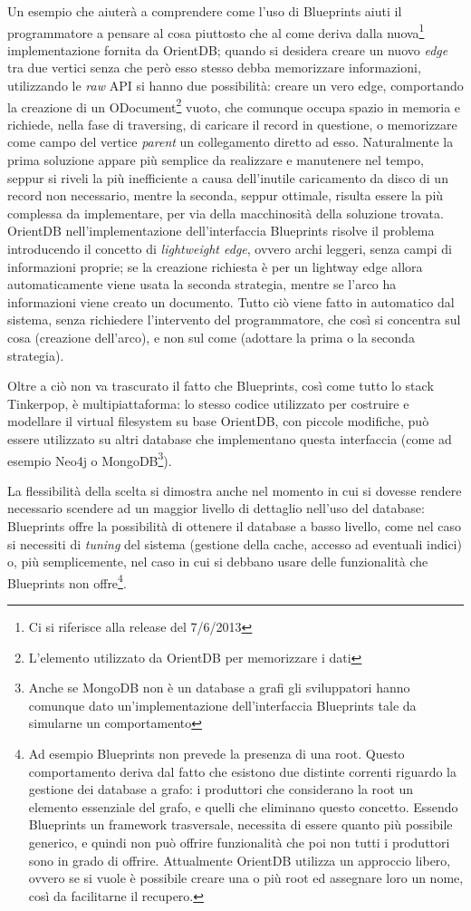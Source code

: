 Un esempio che aiuterà a comprendere come l'uso di Blueprints aiuti il programmatore a pensare al cosa piuttosto che al come deriva dalla nuova\footnote{Ci si riferisce alla release del 7/6/2013} implementazione fornita da OrientDB; quando si desidera creare un nuovo \emph{edge} tra due vertici senza che però esso stesso debba memorizzare informazioni, utilizzando le \emph{raw} API si hanno due possibilità: creare un vero edge, comportando la creazione di un ODocument\footnote{L'elemento utilizzato da OrientDB per memorizzare i dati} vuoto, che comunque occupa spazio in memoria e richiede, nella fase di traversing, di caricare il record in questione, o memorizzare come campo del vertice \emph{parent} un collegamento diretto ad esso. Naturalmente la prima soluzione appare più semplice da realizzare e manutenere nel tempo, seppur si riveli la più inefficiente a causa dell'inutile caricamento da disco di un record non necessario, mentre la seconda, seppur ottimale, risulta essere la più complessa da implementare, per via della macchinosità della soluzione trovata. OrientDB nell'implementazione dell'interfaccia Blueprints risolve il problema introducendo il concetto di \emph{lightweight edge}, ovvero archi leggeri, senza campi di informazioni proprie; se la creazione richiesta è per un lightway edge allora automaticamente viene usata la seconda strategia, mentre se l'arco ha informazioni viene creato un documento. Tutto ciò viene fatto in automatico dal sistema, senza richiedere l'intervento del programmatore, che così si concentra sul cosa (creazione dell'arco), e non sul come (adottare la prima o la seconda strategia).

Oltre a ciò non va trascurato il fatto che Blueprints, così come tutto lo stack Tinkerpop, è multipiattaforma: lo stesso codice utilizzato per costruire e modellare il virtual filesystem su base OrientDB, con piccole modifiche, può essere utilizzato su altri database che implementano questa interfaccia (come ad esempio Neo4j o MongoDB\footnote{Anche se MongoDB non è un database a grafi gli sviluppatori hanno comunque dato un'implementazione dell'interfaccia Blueprints tale da simularne un comportamento}).

La flessibilità della scelta si dimostra anche nel momento in cui si dovesse rendere necessario scendere ad un maggior livello di dettaglio nell'uso del database: Blueprints offre la possibilità di ottenere il database a basso livello, come nel caso si necessiti di \emph{tuning} del sistema (gestione della cache, accesso ad eventuali indici) o, più semplicemente, nel caso in cui si debbano usare delle funzionalità che Blueprints non offre\footnote{Ad esempio Blueprints non prevede la presenza di una root. Questo comportamento deriva dal fatto che esistono due distinte correnti riguardo la gestione dei database a grafo: i produttori che considerano la root un elemento essenziale del grafo, e quelli che eliminano questo concetto. Essendo Blueprints un framework trasversale, necessita di essere quanto più possibile generico, e quindi non può offrire funzionalità che poi non tutti i produttori sono in grado di offrire. Attualmente OrientDB utilizza un approccio libero, ovvero se si vuole è possibile creare una o più root ed assegnare loro un nome, così da facilitarne il recupero.}.

